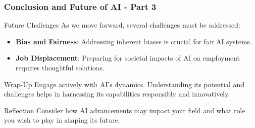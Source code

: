 \documentclass[aspectratio=169]{beamer}
\begin{document}
\begin{frame}[fragile]
    \frametitle{Conclusion and Future of AI - Part 3}
    \begin{block}{Future Challenges}
        As we move forward, several challenges must be addressed:
    \end{block}
    
    \begin{itemize}
        \item \textbf{Bias and Fairness}: Addressing inherent biases is crucial for fair AI systems.
        \item \textbf{Job Displacement}: Preparing for societal impacts of AI on employment requires thoughtful solutions.
    \end{itemize}

    \begin{block}{Wrap-Up}
        Engage actively with AI's dynamics. Understanding its potential and challenges helps in harnessing its capabilities responsibly and innovatively.
    \end{block}
    
    \begin{block}{Reflection}
        Consider how AI advancements may impact your field and what role you wish to play in shaping its future.
    \end{block}
\end{frame}
\end{document}
